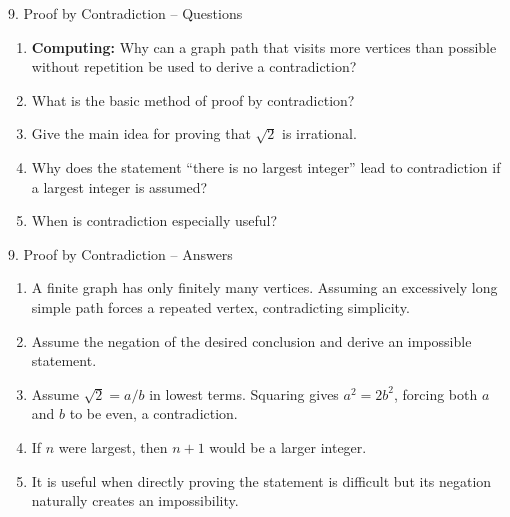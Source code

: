 \documentclass[aspectratio=169,11pt]{beamer}
\begin{document}
\begin{frame}{9. Proof by Contradiction -- Questions}

\begin{enumerate}
\item \textbf{Computing:} Why can a graph path that visits more vertices than possible without repetition be used to derive a contradiction?

\item What is the basic method of proof by contradiction?

\item Give the main idea for proving that $\sqrt2$ is irrational.

\item Why does the statement ``there is no largest integer'' lead to contradiction if a largest integer is assumed?

\item When is contradiction especially useful?
\end{enumerate}

\end{frame}

\begin{frame}{9. Proof by Contradiction -- Answers}

\begin{enumerate}
\item A finite graph has only finitely many vertices. Assuming an excessively long simple path forces a repeated vertex, contradicting simplicity.

\item Assume the negation of the desired conclusion and derive an impossible statement.

\item Assume $\sqrt2=a/b$ in lowest terms. Squaring gives $a^2=2b^2$, forcing both $a$ and $b$ to be even, a contradiction.

\item If $n$ were largest, then $n+1$ would be a larger integer.

\item It is useful when directly proving the statement is difficult but its negation naturally creates an impossibility.
\end{enumerate}

\end{frame}

\end{document}
